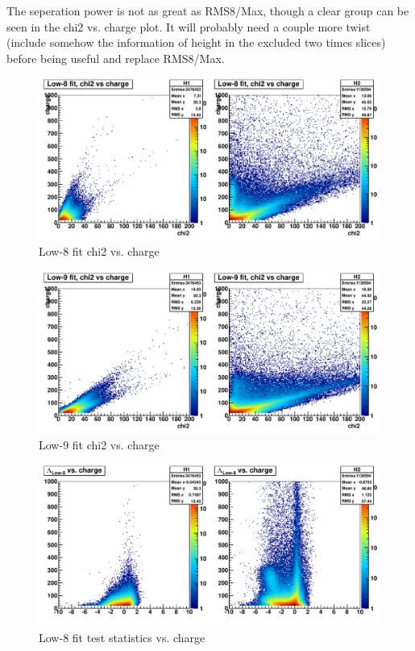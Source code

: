 The seperation power is not as great as RMS8/Max, though a clear group can be seen in the chi2 vs. charge plot.
It will probably need a couple more twist (include somehow the information of height in the excluded two times slices)
before being useful and replace RMS8/Max.

\begin{figure}
   \includegraphics[width=120mm]{DailyLog/6324/6324HLow8FitChi2VsCharge.pdf}
   \caption{Low-8 fit chi2 vs. charge}
   \label{Figure_6324HLow8FitChi2VsCharge}
\end{figure}

\begin{figure}
   \includegraphics[width=120mm]{DailyLog/6324/6324HLow9FitChi2VsCharge.pdf}
   \caption{Low-9 fit chi2 vs. charge}
   \label{Figure_6324HLow9FitChi2VsCharge}
\end{figure}

\begin{figure}
   \includegraphics[width=120mm]{DailyLog/6324/6324HTestStatisticsLow8VsCharge.pdf}
   \caption{Low-8 fit test statistics vs. charge}
   \label{Figure_6324HTestStatisticsLow8VsCharge}
\end{figure}

